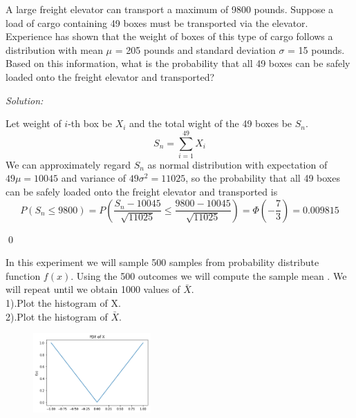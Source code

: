 \documentclass[12pt]{article}
\newenvironment{problem}[2][Problem]{\begin{trivlist}
\item[\hskip \labelsep {\bfseries #1}\hskip \labelsep {\bfseries #2.}]}{\end{trivlist}}
\newenvironment{sol}
    {\emph{Solution:}
    }
    {
    \qed
    }
\begin{document}
\begin{problem}{4}
A large freight elevator can transport a maximum of 9800 pounds. Suppose a load of cargo containing 49 boxes must be
transported via the elevator. Experience has shown that the weight of boxes of this type of cargo follows a distribution with
mean $\mu$  = 205 pounds and standard deviation $\sigma$  = 15 pounds. Based on this information, what is the probability that all 49
boxes can be safely loaded onto the freight elevator and transported?
\end{problem}
\begin{sol}
Let weight of $i$-th box be $X_i$ and the total wight of the 49 boxes be $S_n$.
\[
S_n=\sum_{i=1}^{49}X_i
\]
We can approximately regard $S_n$ as normal distribution with expectation of $49\mu=10045$ and variance of $49\sigma^2=11025$, so the probability that all 49 boxes can be safely loaded onto the freight elevator and transported is
\[
P(S_n\leq9800)=P(\frac{S_n-10045}{\sqrt{11025}}\leq\frac{9800-10045}{\sqrt{11025}})=\Phi(-\frac{7}{3})=0.009815
\]
\end{sol}


\begin{problem}{5}
In this experiment we will sample 500 samples from probability distribute function $f(x)$. Using the 500 outcomes we will compute the
sample mean . We will repeat until we obtain 1000 values of $ \bar{X}$.\\
1).Plot the histogram of X.\\
2).Plot the histogram of $\bar{X}$.

\begin{figure}[h]
\centering
\includegraphics[width=0.4\textwidth]{hw7.png}
\end{figure}
\end{problem}
\end{document}
